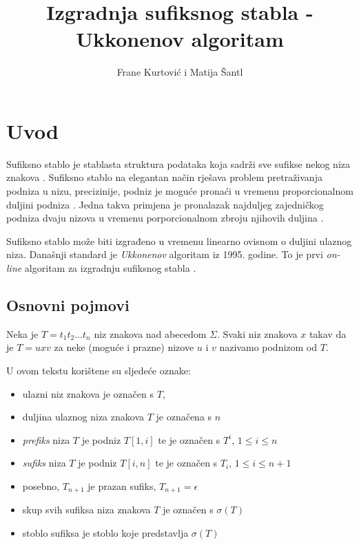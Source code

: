 \documentclass[times, utf8, seminar, numeric]{fer}
\begin{document}
\renewcommand{\figurename}{Slika}
\renewcommand{\tablename}{Tablica}
\renewcommand{\lstlistingname}{Programski odsječak}
\newtheorem{lema}{Lema}

\title{Izgradnja sufiksnog stabla - Ukkonenov algoritam}

\author{Frane Kurtović i Matija Šantl}


\maketitle

\tableofcontents

\chapter{Uvod}
Sufiksno stablo  je stablasta struktura podataka koja sadrži sve sufikse nekog niza znakova \cite{ukkonen}. Sufiksno stablo na elegantan način rješava problem pretraživanja podniza u nizu, precizinije, podniz je moguće pronaći u vremenu proporcionalnom duljini podniza \cite{mile}. Jedna takva primjena je pronalazak najduljeg zajedničkog podniza dvaju nizova u vremenu porporcionalnom zbroju njihovih duljina \cite{gusfield}.
	
	Sufiksno stablo može biti izgrađeno u vremenu linearno ovisnom o duljini ulaznog niza. Današnji standard je \textit{Ukkonenov} algoritam iz 1995. godine. To je prvi \textit{on-line} algoritam za izgradnju sufiksnog stabla \cite{mile}.
		
\section{Osnovni pojmovi}
	Neka je $T = t_1 t_2 ... t_n$ niz znakova nad abecedom $\Sigma$. Svaki niz znakova $x$ takav da je $T=u x v$ za neke (moguće i prazne) nizove $u$ i $v$ nazivamo podnizom od $T$.

U ovom tekstu korištene su sljedeće oznake:
\begin{itemize}
	\item ulazni niz znakova je označen s $T$,
	\item duljina ulaznog niza znakova $T$ je označena s $n$
	\item \textit{prefiks} niza $T$ je podniz $T[1, i]$ te je označen s $T^i$, $1 \le i \le n$
	\item \textit{sufiks} niza $T$ je podniz $T[i, n]$ te je označen s $T_i$, $1 \le i \le n + 1$
	\item posebno, $T_{n+1}$ je prazan sufiks, $T_{n+1} = \epsilon$
	\item skup svih sufiksa niza znakova $T$ je označen s $\sigma(T)$
	\item stoblo sufiksa  je stoblo koje predstavlja $\sigma(T)$
\end{itemize}
\end{document}
